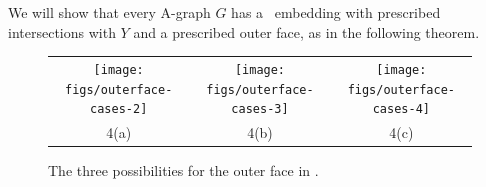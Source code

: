 %
%

We will show that every A-graph $G$ has a \Fary\ embedding with prescribed intersections with $Y$ and a prescribed outer face, as in the following theorem. 

\begin{figure}
   \begin{center}\begin{tabular}{ccc}
      \texttt{[image: figs/outerface-cases-2]} & 
      \texttt{[image: figs/outerface-cases-3]} & 
      \texttt{[image: figs/outerface-cases-4]} \\
      4(a) & 4(b) & 4(c)
   \end{tabular}\end{center}
   \caption{The three possibilities for the outer face in .}
\end{figure} 


